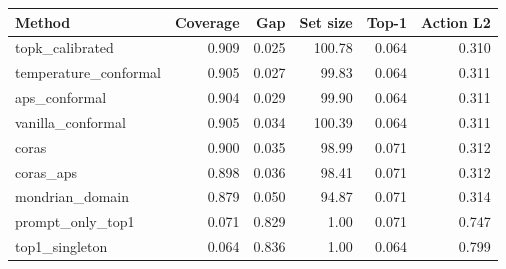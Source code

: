 \begin{tabular}{lrrrrr}
\toprule
Method & Coverage & Gap & Set size & Top-1 & Action L2 \\
\midrule
topk\_calibrated & 0.909 & 0.025 & 100.78 & 0.064 & 0.310 \\
temperature\_conformal & 0.905 & 0.027 & 99.83 & 0.064 & 0.311 \\
aps\_conformal & 0.904 & 0.029 & 99.90 & 0.064 & 0.311 \\
vanilla\_conformal & 0.905 & 0.034 & 100.39 & 0.064 & 0.311 \\
coras & 0.900 & 0.035 & 98.99 & 0.071 & 0.312 \\
coras\_aps & 0.898 & 0.036 & 98.41 & 0.071 & 0.312 \\
mondrian\_domain & 0.879 & 0.050 & 94.87 & 0.071 & 0.314 \\
prompt\_only\_top1 & 0.071 & 0.829 & 1.00 & 0.071 & 0.747 \\
top1\_singleton & 0.064 & 0.836 & 1.00 & 0.064 & 0.799 \\
\bottomrule
\end{tabular}